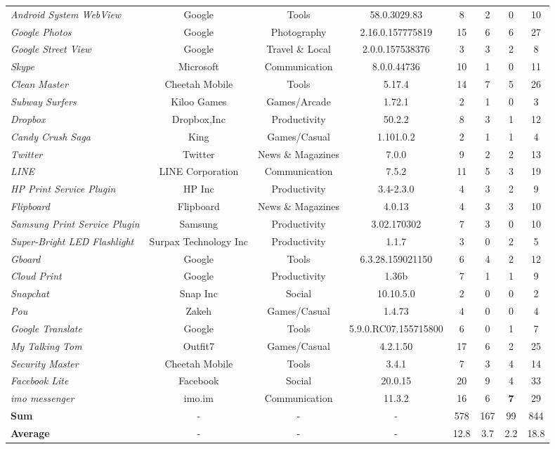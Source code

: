 \documentclass[sigconf,review, anonymous]{acmart}
\begin{document}
\begin{table}
\begin{tabular}{|l|c|c|c|cccc|}
{\it Android System WebView}&Google&Tools&58.0.3029.83&8&2&0&10\\
{\it Google Photos}&Google&Photography&2.16.0.157775819&15&6&6&27\\
{\it Google Street View}&Google&Travel \& Local&2.0.0.157538376&3&3&2&8\\
{\it Skype}&Microsoft&Communication&8.0.0.44736&10&1&0&11\\
{\it Clean Master}&Cheetah Mobile&Tools&5.17.4&14&7&5&26\\
{\it Subway Surfers}&Kiloo Games&Games/Arcade&1.72.1&2&1&0&3\\
{\it Dropbox}&Dropbox,Inc&Productivity&50.2.2&8&3&1&12\\
{\it Candy Crush Saga}&King&Games/Casual&1.101.0.2&2&1&1&4\\
{\it Twitter}&Twitter&News \& Magazines&7.0.0&9&2&2&13\\
{\it LINE}&LINE Corporation&Communication&7.5.2&11&5&3&19\\
{\it HP Print Service Plugin}&HP Inc&Productivity&3.4-2.3.0&4&3&2&9\\
{\it Flipboard}&Flipboard&News \& Magazines&4.0.13&4&3&3&10\\
{\it Samsung Print Service Plugin}&Samsung&Productivity&3.02.170302&7&3&0&10\\
{\it Super-Bright LED Flashlight}&Surpax Technology Inc&Productivity&1.1.7&3&0&2&5\\
{\it Gboard}&Google&Tools&6.3.28.159021150&6&4&2&12\\
{\it Cloud Print}&Google&Productivity&1.36b&7&1&1&9\\
{\it Snapchat}&Snap Inc&Social&10.10.5.0&2&0&0&2\\
{\it Pou}&Zakeh&Games/Casual&1.4.73&4&0&0&4\\
{\it Google Translate}&Google&Tools&5.9.0.RC07.155715800&6&0&1&7\\
{\it My Talking Tom}&Outfit7&Games/Casual&4.2.1.50&17&6&2&25\\
{\it Security Master}&Cheetah Mobile&Tools&3.4.1&7&3&4&14\\
{\it Facebook Lite}&Facebook&Social&20.0.15&20&9&4&33 \\
{\it imo messenger}&imo.im&Communication&11.3.2&16&6&{\bf 7}&29\\
\hline
{\bf Sum}& - & -& -& 578 &167  &  99 &  844\\
\hline
{\bf Average}&-&-&-&12.8 &  3.7 &  2.2 &  18.8\\
\hline
\end{tabular}
\label{tab_benchmark}
\end{table}
\end{document}
